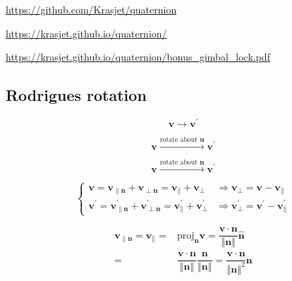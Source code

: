 \documentclass[
]{book}
\theoremstyle{definition}
\theoremstyle{definition}
\theoremstyle{definition}
\theoremstyle{definition}
\theoremstyle{remark}
\begin{document}
\url{https://github.com/Krasjet/quaternion}

\url{https://krasjet.github.io/quaternion/}

\url{https://krasjet.github.io/quaternion/bonus_gimbal_lock.pdf}

\hypertarget{rodrigues-rotation}{%
\subsection{Rodrigues rotation}\label{rodrigues-rotation}}

\[
\boldsymbol{v}\rightarrow\boldsymbol{v}^{\prime}
\]

\[
\boldsymbol{v}\xrightarrow{\text{rotate about }\boldsymbol{u}}\boldsymbol{v}^{\prime}
\]

\[
\boldsymbol{v}\xrightarrow{\text{rotate about }\boldsymbol{n}}\boldsymbol{v}^{\prime}
\]

\[
\begin{cases}
\boldsymbol{v}=\boldsymbol{v}_{{\scriptscriptstyle \parallel\boldsymbol{n}}}+\boldsymbol{v}_{{\scriptscriptstyle \perp\boldsymbol{n}}}=\boldsymbol{v}_{{\scriptscriptstyle \parallel}}+\boldsymbol{v}_{{\scriptscriptstyle \perp}} & \Rightarrow\boldsymbol{v}_{{\scriptscriptstyle \perp}}=\boldsymbol{v}-\boldsymbol{v}_{{\scriptscriptstyle \parallel}}\\
\boldsymbol{v}^{\prime}=\boldsymbol{v}_{{\scriptscriptstyle \parallel\boldsymbol{n}}}^{\prime}+\boldsymbol{v}_{{\scriptscriptstyle \perp\boldsymbol{n}}}^{\prime}=\boldsymbol{v}_{{\scriptscriptstyle \parallel}}^{\prime}+\boldsymbol{v}_{{\scriptscriptstyle \perp}}^{\prime} & \Rightarrow\boldsymbol{v}_{{\scriptscriptstyle \perp}}^{\prime}=\boldsymbol{v}^{\prime}-\boldsymbol{v}_{{\scriptscriptstyle \parallel}}^{\prime}
\end{cases}
\]

\[
\begin{aligned}
\boldsymbol{v}_{{\scriptscriptstyle \parallel\boldsymbol{n}}}=\boldsymbol{v}_{{\scriptscriptstyle \parallel}}= & \mathrm{proj}_{{\scriptscriptstyle \boldsymbol{n}}}\boldsymbol{v}=\dfrac{\boldsymbol{v}\cdot\boldsymbol{n}}{\left\Vert \boldsymbol{n}\right\Vert }\hat{\boldsymbol{n}}\\
= & \dfrac{\boldsymbol{v}\cdot\boldsymbol{n}}{\left\Vert \boldsymbol{n}\right\Vert }\dfrac{\boldsymbol{n}}{\left\Vert \boldsymbol{n}\right\Vert }=\dfrac{\boldsymbol{v}\cdot\boldsymbol{n}}{\left\Vert \boldsymbol{n}\right\Vert ^{2}}\boldsymbol{n}
\end{aligned}
\]
\end{document}
